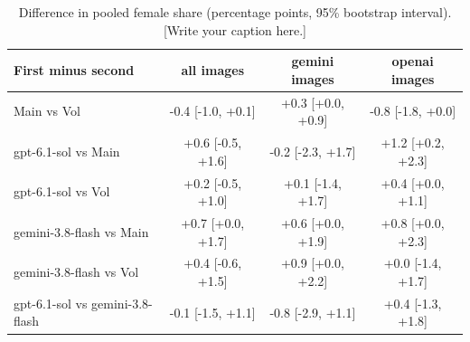 \begin{table}[t]
\centering
\scriptsize
\begin{tabular}{@{}lccc@{}}
\toprule
First minus second & \textbf{all images} & \textbf{gemini images} & \textbf{openai images} \\
\midrule
Main vs Vol & -0.4 [-1.0, +0.1] & +0.3 [+0.0, +0.9] & -0.8 [-1.8, +0.0] \\
gpt-6.1-sol vs Main & +0.6 [-0.5, +1.6] & -0.2 [-2.3, +1.7] & +1.2 [+0.2, +2.3] \\
gpt-6.1-sol vs Vol & +0.2 [-0.5, +1.0] & +0.1 [-1.4, +1.7] & +0.4 [+0.0, +1.1] \\
gemini-3.8-flash vs Main & +0.7 [+0.0, +1.7] & +0.6 [+0.0, +1.9] & +0.8 [+0.0, +2.3] \\
gemini-3.8-flash vs Vol & +0.4 [-0.6, +1.5] & +0.9 [+0.0, +2.2] & +0.0 [-1.4, +1.7] \\
gpt-6.1-sol vs gemini-3.8-flash & -0.1 [-1.5, +1.1] & -0.8 [-2.9, +1.1] & +0.4 [-1.3, +1.8] \\
\bottomrule
\end{tabular}
\caption{Difference in pooled female share (percentage points, 95\% bootstrap interval). [Write your caption here.]}
\label{tab:female-share}
\end{table}
